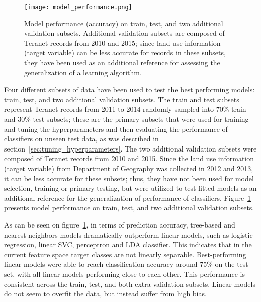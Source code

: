 \begin{figure}[hbt!]
    \centering
    \texttt{[image: model\_performance.png]}
    \caption{Model performance (accuracy) on train, test, and two additional validation subsets.
    Additional validation subsets are composed of Teranet records from 2010 and 2015;
    since land use information (target variable) can be less accurate for records in these subsets, they have been used as an additional reference for assessing the generalization of a learning algorithm.}
    \label{fig:model_performance}
\end{figure}

Four different subsets of data have been used to test the best performing models: train, test, and two additional validation subsets.
The train and test subsets represent Teranet records from 2011 to 2014 randomly sampled into 70\% train and 30\% test subsets;
these are the primary subsets that were used for training and tuning the hyperparameters and then evaluating the performance of classifiers on unseen test data, as was described in section~\ref{sec:tuning_hyperparameters}.
The two additional validation subsets were composed of Teranet records from 2010 and 2015.
Since the land use information (target variable) from Department of Geography was collected in 2012 and 2013, it can be less accurate for these subsets;
thus, they have not been used for model selection, training or primary testing, but were utilized to test fitted models as an additional reference for the generalization of performance of classifiers.
Figure~\ref{fig:model_performance} presents model performance on train, test, and two additional validation subsets.

As can be seen on figure~\ref{fig:model_performance}, in terms of prediction accuracy, tree-based and nearest neighbors models dramatically outperform linear models, such as logistic regression, linear SVC, perceptron and LDA classifier.
This indicates that in the current feature space target classes are not linearly separable.
Best-performing linear models were able to reach classification accuracy around 75\% on the test set, with all linear models performing close to each other.
This performance is consistent across the train, test, and both extra validation subsets.
Linear models do not seem to overfit the data, but instead suffer from high bias.

